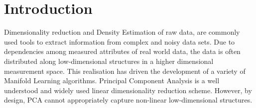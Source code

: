 \section{Introduction}


Dimensionality reduction and Density Estimation of raw data, are commonly used tools to extract information from complex and noisy data sets.
Due to dependencies among measured attributes of real world data,
the data is often distributed along low-dimensional structures in a higher dimensional measurement space.
This realisation has driven the development of a variety of Manifold Learning algorithms.
Principal Component Analysis \citep[PCA, ][]{Pearson1901} is a well understood and widely used linear dimensionality reduction scheme.
However, by design, PCA cannot appropriately capture non-linear low-dimensional structures.



